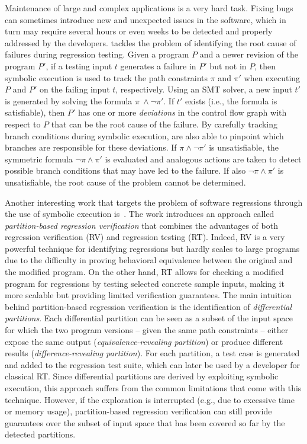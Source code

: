 \smallskip
Maintenance of large and complex applications is a very hard task. Fixing bugs can sometimes introduce new and unexpected issues in the software, which in turn may require several hours or even weeks to be detected and properly addressed by the developers. \cite{QRL-TOSEM12} tackles the problem of identifying the root cause of failures during regression testing. Given a program $P$ and a newer revision of the program $P'$, if a testing input $t$ generates a failure in $P'$ but not in  $P$, then symbolic execution is used to track the path constraints $\pi$ and $\pi'$ when executing $P$ and $P'$ on the failing input $t$, respectively. Using an SMT solver, a new input $t'$ is generated by solving the formula $\pi ~\wedge \neg\pi'$. If $t'$ exists (i.e., the formula is satisfiable), then $P'$ has one or more {\em deviations} in the control flow graph with respect to $P$ that can be the root cause of the failure. By carefully tracking branch conditions during symbolic execution, \cite{QRL-TOSEM12} are also able to pinpoint which branches are responsible for these deviations. If $\pi \wedge \neg\pi'$ is unsatisfiable, the symmetric formula $\neg\pi \wedge \pi'$ is evaluated and analogous actions are taken to detect possible branch conditions that may have led to the failure. If also $\neg\pi \wedge \pi'$ is unsatisfiable, the root cause of the problem cannot be determined.

Another interesting work that targets the problem of software regressions through the use of symbolic execution is~\cite{BOR-ICSE13}. The work introduces an approach called {\em partition-based regression verification} that combines the advantages of both regression verification (RV) and regression testing (RT). Indeed, RV is a very powerful technique for identifying regressions but hardly scales to large programs due to the difficulty in proving behavioral equivalence between the original and the modified program. On the other hand, RT allows for checking a modified program for regressions by testing selected concrete sample inputs, making it more scalable but providing limited verification guarantees. The main intuition behind partition-based regression verification is the identification of {\em differential partitions}. Each differential partition can be seen as a subset of the input space for which the two program versions -- given the same path constraints -- either expose the same output ({\em equivalence-revealing partition}) or produce different results ({\em difference-revealing partition}). For each partition, a test case is generated and added to the regression test suite, which can later be used by a developer for classical RT. Since differential partitions are derived by exploiting symbolic execution, this approach suffers from the common limitations that come with this technique. However, if the exploration is interrupted (e.g., due to excessive time or memory usage), partition-based regression verification can still provide guarantees over the subset of input space that has been covered so far by the detected partitions.

